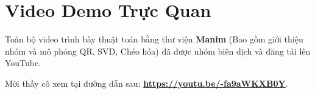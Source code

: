 \documentclass[a4paper]{article}
\renewcommand{\figurename}{Hình}
\begin{document}


\thispagestyle{empty}

\newpage
\renewcommand{\contentsname}{Table of Contents}
\renewcommand{\tablename}{Table}
\renewcommand{\figurename}{Figure}
\renewcommand{\refname}{References}
\renewcommand{\listfigurename}{List of Figures}
\renewcommand{\listtablename}{List of Tables}

\tableofcontents

\newpage

\renewcommand{\arraystretch}{1.3} %
\setcounter{page}{1}

\section*{Video Demo Trực Quan}
Toàn bộ video trình bày thuật toán bằng thư viện \textbf{Manim} (Bao gồm giới thiệu nhóm và mô phỏng QR, SVD, Chéo hóa) đã được nhóm biên dịch và đăng tải lên YouTube.

Mời thầy cô xem tại đường dẫn sau: \textbf{\url{https://youtu.be/-fa9aWKXB0Y}}.

\vspace{1cm}





\newpage


\end{document}
